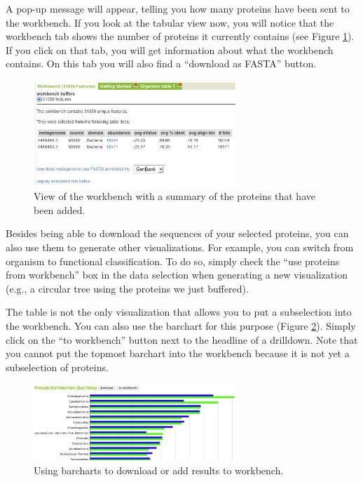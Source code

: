 \documentclass[12pt,fullpage]{report}
\begin{document}
A pop-up message will appear, telling you how many proteins have been sent to the workbench. If you look at the tabular view now, you will notice that the workbench tab shows the number of proteins it currently contains (see Figure \ref{fig:workbench}). If you click on that tab, you will get information about what the workbench contains. On this tab you will also find a ``download as FASTA'' button.

\begin{figure}
\begin{center}
\includegraphics[width=3in]{Images/workbench.png}
\end{center}
\caption{
View of the workbench with a summary of the proteins that have been added.
}
\label{fig:workbench}
\end{figure}

Besides being able to download the sequences of your selected proteins, you can also use them to generate other visualizations. For example, you can switch from organism to functional classification. To do so, simply check the ``use proteins from workbench'' box in the data selection when generating a new visualization (e.g., a circular tree using the proteins we just buffered).

The table is not the only visualization that allows you to put a subselection into the workbench. You can also use the barchart for this purpose (Figure \ref{fig:barchart-from-workbench}). Simply click on the ``to workbench'' button next to the headline of a drilldown. Note that you cannot put the topmost barchart into the workbench because it is not yet a subselection of proteins.

\begin{figure}
\begin{center}
\includegraphics[width=3in]{Images/barchart-from-workbench.png}
\end{center}
\caption{Using barcharts to download or add results to workbench.}
\label{fig:barchart-from-workbench}
\end{figure}
\end{document}
